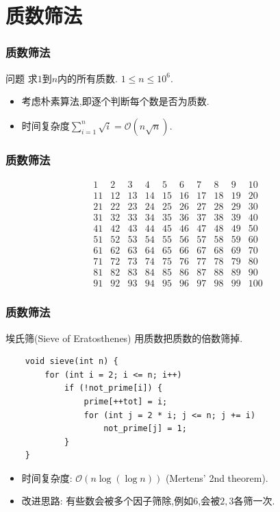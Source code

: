 \documentclass{beamer}
\newcommand{\pau}{}
\begin{document}
\section{质数筛法}
\begin{frame}[fragile]
    \frametitle{质数筛法}
    \begin{block}{问题}
        求$1$到$n$内的所有质数. $1\leqslant n\leqslant 10^6$.
    \end{block} \pau
    \begin{itemize}
        \item 考虑朴素算法,即逐个判断每个数是否为质数. \pau
        \item 时间复杂度$\sum\limits_{i=1}^n\sqrt{i}=\mathcal{O}(n\sqrt{n})$.
    \end{itemize}
\end{frame}

\begin{frame}[fragile]
    \frametitle{质数筛法}
    $$\begin{matrix}
        1&2&3&4&5&6&7&8&9&10\\
        11&12&13&14&15&16&17&18&19&20\\
        21&22&23&24&25&26&27&28&29&30\\
        31&32&33&34&35&36&37&38&39&40\\
        41&42&43&44&45&46&47&48&49&50\\
        51&52&53&54&55&56&57&58&59&60\\
        61&62&63&64&65&66&67&68&69&70\\
        71&72&73&74&75&76&77&78&79&80\\
        81&82&83&84&85&86&87&88&89&90\\
        91&92&93&94&95&96&97&98&99&100
    \end{matrix}$$
\end{frame}

\begin{frame}[fragile]
    \frametitle{质数筛法}
    \begin{block}{埃氏筛(Sieve of Eratosthenes)}
        用质数把质数的倍数筛掉.
    \end{block} \pau
    \begin{verbatim}
    void sieve(int n) {
        for (int i = 2; i <= n; i++)
            if (!not_prime[i]) {
                prime[++tot] = i;
                for (int j = 2 * i; j <= n; j += i)
                    not_prime[j] = 1;
            }
    }
    \end{verbatim}
    \pau\begin{itemize}
        \item 时间复杂度: $\mathcal{O}(n\log(\log n))$ (Mertens' 2nd theorem). \pau
        \item 改进思路: 有些数会被多个因子筛除,例如$6$,会被$2,3$各筛一次.
    \end{itemize}
\end{frame}
\end{document}
